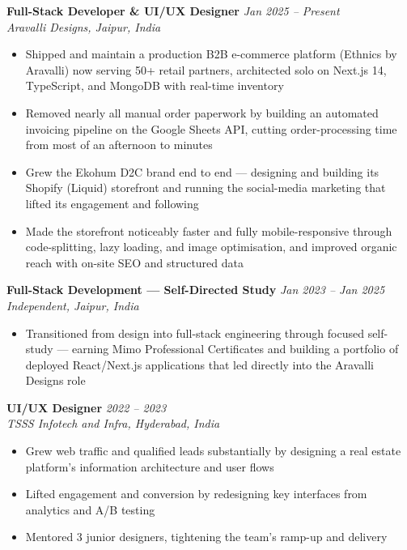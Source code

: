 \documentclass[10pt,a4paper]{article}
\begin{document}
\textbf{Full-Stack Developer \& UI/UX Designer} \hfill \textit{Jan 2025 -- Present} \\
\textit{Aravalli Designs, Jaipur, India}
\begin{itemize}
    \item Shipped and maintain a production B2B e-commerce platform (Ethnics by Aravalli) now serving 50+ retail partners, architected solo on Next.js 14, TypeScript, and MongoDB with real-time inventory
    \item Removed nearly all manual order paperwork by building an automated invoicing pipeline on the Google Sheets API, cutting order-processing time from most of an afternoon to minutes
    \item Grew the Ekohum D2C brand end to end --- designing and building its Shopify (Liquid) storefront and running the social-media marketing that lifted its engagement and following
    \item Made the storefront noticeably faster and fully mobile-responsive through code-splitting, lazy loading, and image optimisation, and improved organic reach with on-site SEO and structured data
\end{itemize}

\textbf{Full-Stack Development --- Self-Directed Study} \hfill \textit{Jan 2023 -- Jan 2025} \\
\textit{Independent, Jaipur, India}
\begin{itemize}
    \item Transitioned from design into full-stack engineering through focused self-study --- earning Mimo Professional Certificates and building a portfolio of deployed React/Next.js applications that led directly into the Aravalli Designs role
\end{itemize}

\textbf{UI/UX Designer} \hfill \textit{2022 -- 2023} \\
\textit{TSSS Infotech and Infra, Hyderabad, India}
\begin{itemize}
    \item Grew web traffic and qualified leads substantially by designing a real estate platform's information architecture and user flows
    \item Lifted engagement and conversion by redesigning key interfaces from analytics and A/B testing
    \item Mentored 3 junior designers, tightening the team's ramp-up and delivery
\end{itemize}
\end{document}
